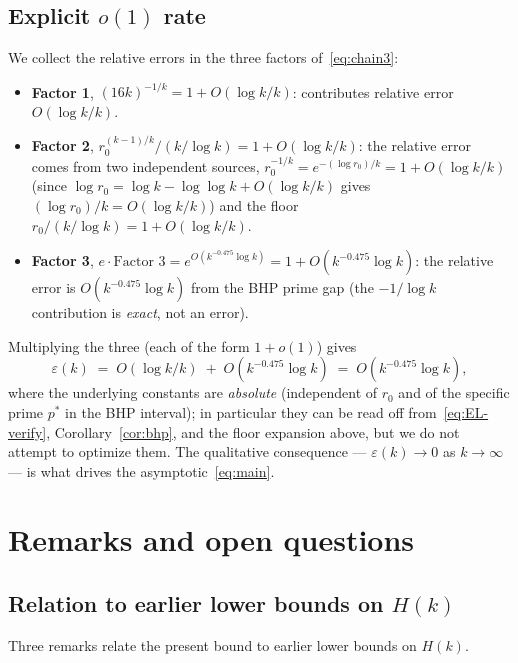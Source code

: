 \documentclass[11pt,reqno,a4paper]{amsart}
\theoremstyle{plain}
\theoremstyle{definition}
\theoremstyle{remark}
\numberwithin{equation}{section}
\begin{document}
\subsection{Explicit \texorpdfstring{$o(1)$}{o(1)} rate}
\label{subsec:eps-rate}

We collect the relative errors in the three factors
of~\eqref{eq:chain3}:

\begin{itemize}
\item \textbf{Factor 1}, $(16k)^{-1/k}=1+O(\log k/k)$: contributes
  relative error $O(\log k/k)$.
\item \textbf{Factor 2}, $r_{0}^{(k-1)/k}/(k/\log k)=1+O(\log k/k)$:
  the relative error comes from two independent sources,
  $r_{0}^{-1/k}=e^{-(\log r_{0})/k}=1+O(\log k/k)$ (since
  $\log r_{0}=\log k-\log\log k+O(\log k/k)$ gives
  $(\log r_{0})/k=O(\log k/k)$) and the floor
  $r_{0}/(k/\log k)=1+O(\log k/k)$.
\item \textbf{Factor 3},
  $e\cdot\text{Factor 3}=e^{O(k^{-0.475}\log k)}=1+O(k^{-0.475}\log k)$:
  the relative error is $O(k^{-0.475}\log k)$ from the BHP prime gap
  (the $-1/\log k$ contribution is \emph{exact}, not an error).
\end{itemize}

Multiplying the three (each of the form $1+o(1)$) gives
\[
\varepsilon(k)\;=\;O(\log k/k)\;+\;O(k^{-0.475}\log k)
\;=\;O(k^{-0.475}\log k),
\]
where the underlying constants are \emph{absolute} (independent of
$r_{0}$ and of the specific prime $p^{*}$ in the BHP interval); in
particular they can be read off from~\eqref{eq:EL-verify},
Corollary~\ref{cor:bhp}, and the floor expansion above, but we do not
attempt to optimize them. The qualitative consequence ---
$\varepsilon(k)\to 0$ as $k\to\infty$ --- is what drives the
asymptotic~\eqref{eq:main}.

\section{Remarks and open questions}
\label{sec:remarks}

\subsection{Relation to earlier lower bounds on \texorpdfstring{$H(k)$}{H(k)}}
\label{subsec:related}

Three remarks relate the present bound to earlier lower bounds
on $H(k)$.
\end{document}
